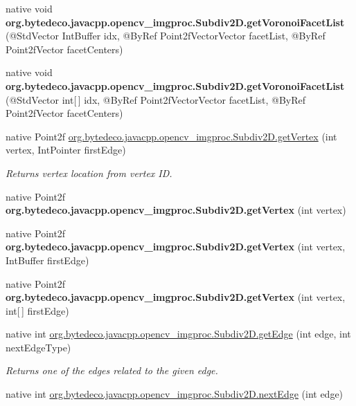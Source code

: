 \begin{DoxyCompactItemize}
native void {\bfseries org.\+bytedeco.\+javacpp.\+opencv\+\_\+imgproc.\+Subdiv2\+D.\+get\+Voronoi\+Facet\+List} (@Std\+Vector Int\+Buffer idx, @By\+Ref Point2f\+Vector\+Vector facet\+List, @By\+Ref Point2f\+Vector facet\+Centers)
\item 
\mbox{\label{group__imgproc_ga0b28e3fc4285948f3de2eadb5c55fb9c}} 
native void {\bfseries org.\+bytedeco.\+javacpp.\+opencv\+\_\+imgproc.\+Subdiv2\+D.\+get\+Voronoi\+Facet\+List} (@Std\+Vector int\mbox{[}$\,$\mbox{]} idx, @By\+Ref Point2f\+Vector\+Vector facet\+List, @By\+Ref Point2f\+Vector facet\+Centers)
\item 
native Point2f \hyperlink{group__imgproc_gaf2a77c9870a51b9b26eb2eff3e77b97e}{org.\+bytedeco.\+javacpp.\+opencv\+\_\+imgproc.\+Subdiv2\+D.\+get\+Vertex} (int vertex, Int\+Pointer first\+Edge)
\begin{DoxyCompactList}\small\item\em Returns vertex location from vertex ID. \end{DoxyCompactList}\item 
\mbox{\label{group__imgproc_gab8b524a58702870ec3a745bc8eb22ee8}} 
native Point2f {\bfseries org.\+bytedeco.\+javacpp.\+opencv\+\_\+imgproc.\+Subdiv2\+D.\+get\+Vertex} (int vertex)
\item 
\mbox{\label{group__imgproc_ga902f0d947039fa5e4c0beaab4fa5bfdf}} 
native Point2f {\bfseries org.\+bytedeco.\+javacpp.\+opencv\+\_\+imgproc.\+Subdiv2\+D.\+get\+Vertex} (int vertex, Int\+Buffer first\+Edge)
\item 
\mbox{\label{group__imgproc_ga5e9a148db6fdc98cb1e33ec4a0b6546c}} 
native Point2f {\bfseries org.\+bytedeco.\+javacpp.\+opencv\+\_\+imgproc.\+Subdiv2\+D.\+get\+Vertex} (int vertex, int\mbox{[}$\,$\mbox{]} first\+Edge)
\item 
native int \hyperlink{group__imgproc_ga18f65f307c0cb3c2a8d5b851ab025d51}{org.\+bytedeco.\+javacpp.\+opencv\+\_\+imgproc.\+Subdiv2\+D.\+get\+Edge} (int edge, int next\+Edge\+Type)
\begin{DoxyCompactList}\small\item\em Returns one of the edges related to the given edge. \end{DoxyCompactList}\item 
native int \hyperlink{group__imgproc_ga38e3ebcc5d8682369388dd02acaa43a6}{org.\+bytedeco.\+javacpp.\+opencv\+\_\+imgproc.\+Subdiv2\+D.\+next\+Edge} (int edge)

\end{DoxyCompactItemize}
